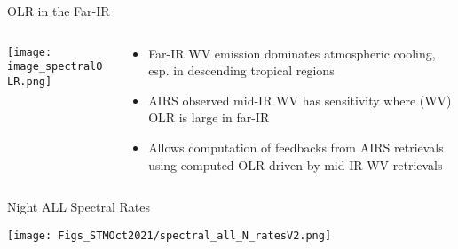 \documentclass[10pt,t]{beamer}
\begin{document}
\begin{frame}{OLR in the Far-IR}
\begin{block}{}

\vspace{-0.1in}
\begin{columns}

\begin{column}{0.55\columnwidth}
\begin{block}{}
\vspace{-0.1in}
\begin{center}
\texttt{[image: image\_spectralOLR.png]}
\end{center}
\end{block}
\end{column}

\begin{column}{0.55\columnwidth}
\begin{block}{}
\begin{itemize}
\item Far-IR WV emission dominates atmospheric cooling, esp. in descending tropical regions
\item AIRS observed mid-IR WV has sensitivity where (WV) OLR is large in far-IR
\item Allows computation of feedbacks from AIRS retrievals using computed OLR driven by mid-IR WV retrievals
\end{itemize}
\end{block}
\end{column}

\end{columns}

\end{block}
\end{frame}


\begin{frame}{Night ALL Spectral Rates}


\begin{center}
\texttt{[image: Figs\_STMOct2021/spectral\_all\_N\_ratesV2.png]}
\end{center}
\end{frame}
\end{document}
